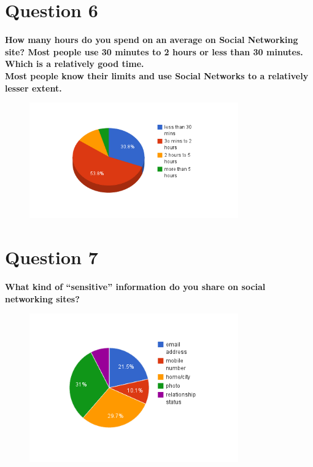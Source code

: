 \documentclass[11pt]{book}
\begin{document}
\chapter{Question 6}
\textbf{How many hours do you spend on an average on Social Networking site?
	Most people use 30 minutes to 2 hours or less than 30 minutes. Which is a relatively good time. 
	\\Most people know their limits and use Social Networks to a relatively lesser extent.
}
\begin{figure}[ht!]
	\centering
	\includegraphics[width=90mm]{questions/6.png}
	\label{overflow}
\end{figure}

\newpage
\chapter{Question 7}
\textbf{What kind of ``sensitive'' information do you share on social networking sites?
}
\begin{figure}[ht!]
	\centering
	\includegraphics[width=90mm]{questions/7.png}
	\label{overflow}
\end{figure}

\newpage
\end{document}

